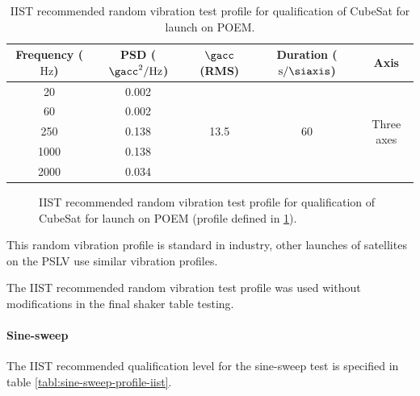 \documentclass[a4paper,11pt]{article}
\begin{document}
\begin{table}[t]
  \centering
  \begin{tabular}{|c | c | c | c | c|}
  \hline
  \textbf{Frequency ($\si{\hertz}$)} & \textbf{PSD ($\si{\square\gacc\per\hertz}$)} & \textbf{$\si{\gacc}$ (RMS)} & \textbf{Duration ($\si{\second\per\siaxis}$)} & \textbf{Axis} \\ \hline
  20  & 0.002 & \multirow{5}{*}{13.5} & \multirow{5}{*}{60} & \multirow{5}{*}{Three axes} \\ \cline{1-2}
  60  & 0.002 &  &  &  \\ \cline{1-2}
  250 & 0.138 &  &  &  \\ \cline{1-2}
  1000 & 0.138 &  &  &  \\ \cline{1-2}
  2000 & 0.034 &  &  &  \\ \hline
  \end{tabular}
  \caption{IIST recommended random vibration test profile for qualification of CubeSat for launch on POEM.}
  \label{tabl:random-vibration-profile-iist}
\end{table}


\begin{figure}[b]
\centering

\label{fig:random-vibration-qualification-level}
\caption{IIST recommended random vibration test profile for qualification of CubeSat for launch on POEM (profile defined in \ref{tabl:random-vibration-profile-iist}).}
\end{figure}

This random vibration profile is standard in industry, other launches of satellites on the PSLV use similar vibration profiles.

The IIST recommended random vibration test profile was used without modifications in the final shaker table testing.

  
\paragraph{Sine-sweep}

The IIST recommended qualification level for the sine-sweep test is specified in table \ref{tabl:sine-sweep-profile-iist}.
\end{document}
